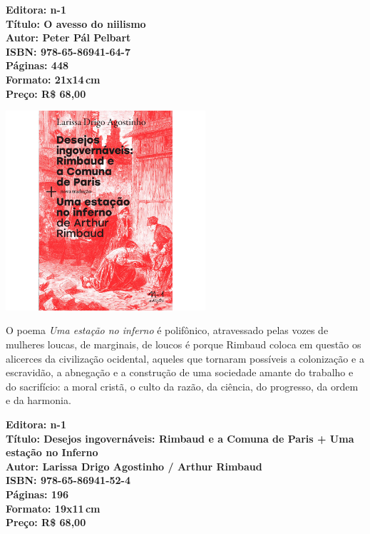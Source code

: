 \vfill

\hspace*{-.4cm}\begin{minipage}[c]{1\linewidth}
\small\textbf{
\hspace*{-.1cm}Editora: n-1\\
Título: O avesso do niilismo\\
Autor: Peter Pál Pelbart\\
ISBN: 978-65-86941-64-7\\
Páginas: 448\\
Formato: 21x14\,cm\\
Preço: R\$ 68,00\\
}
\end{minipage}

\pagebreak

\begin{center}
\hspace*{.5cm}\includegraphics[width=74mm]{./CAPAS/rimbaud.jpg}
\end{center}

\hspace*{-7cm}\hrulefill\hspace*{-7cm}

\medskip

\noindent{}O poema \textit{Uma estação no inferno} é polifônico, atravessado pelas vozes de mulheres loucas, de marginais, de loucos é
porque Rimbaud coloca em questão os alicerces da civilização ocidental, aqueles que tornaram possíveis a colonização e a escravidão, a abnegação e a construção de uma sociedade amante do trabalho e do sacrifício: a moral cristã, o culto da razão, da ciência, do progresso, da ordem e da harmonia.

\vfill

\hspace*{-.4cm}\begin{minipage}[c]{1\linewidth}
\small\textbf{
\hspace*{-.1cm}Editora: n-1\\
Título: Desejos ingovernáveis: Rimbaud e a Comuna de Paris + Uma estação no Inferno\\
Autor: Larissa Drigo Agostinho / Arthur Rimbaud\\
ISBN: 978-65-86941-52-4\\
Páginas: 196\\
Formato: 19x11\,cm\\
Preço: R\$ 68,00\\
}
\end{minipage}

